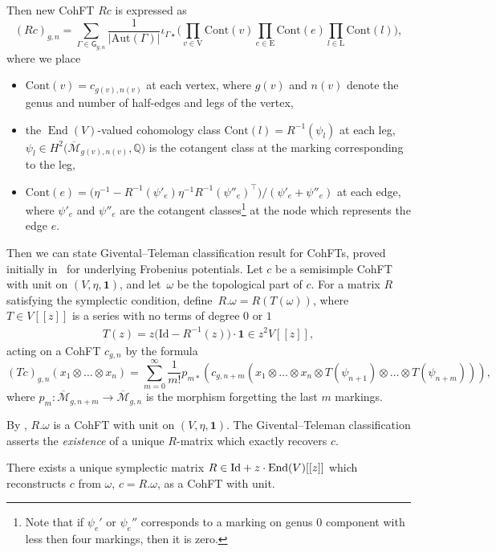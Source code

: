 \documentclass[pdftex]{sigma}
\def\End{{\rm End}}
\def\oM{\overline{\mathcal{M}}}
\def\b1{{\mathbf 1}}
\def\E{\mathrm{E}}
\def\L{\mathrm{L}}
\def\V{\mathrm{V}}
\numberwithin{equation}{section}
\begin{document}
Then new CohFT $Rc$ is expressed as
\[%
(Rc)_{g, n}=
\sum_{\Gamma\in\mathsf{G}_{g,n}} \frac{1}{|\mathrm{Aut}(\Gamma)|} \iota_{\Gamma \star} \biggl(
\prod_{v\in \V}\mathrm{Cont}(v)\prod_{e\in \E}\mathrm{Cont}(e)
\prod_{l\in \L}\mathrm{Cont}(l)
 \biggr) ,
 \]
 where we place
\begin{itemize}\itemsep=0pt
\item [(i)]
$\mathrm{Cont}(v)=c_{g(v), n(v)}$
at each vertex, where $g(v)$ and $n(v)$ denote the genus and number of half-edges and legs of the vertex,
\item [(ii)] the $\operatorname{End}(V)$-valued cohomology class
$\mathrm{Cont}(l)=R^{-1}(\psi_l)$
at each leg,
$\psi_l\!\in\! H^2\big(\oM_{g(v),n(v)},\mathbb{Q}\big)$
is the cotangent class at the marking corresponding to the leg,
\item [(iii)]
$\mathrm{Cont}(e)=\bigl(\eta^{-1}-R^{-1}(\psi'_e)\eta^{-1} R^{-1}(\psi''_e)^{\top}\bigr)/(\psi'_e+\psi''_e)$
at each edge,
where $\psi'_e$ and $\psi''_e$ are the cotangent classes\footnote{Note that if $\psi_e'$ or $\psi_e''$ corresponds to a marking on genus 0 component with less then four markings, then it is zero.} at the node which represents the edge $e$.
\end{itemize}
Then we can state Givental--Teleman classification result for CohFTs, proved initially in~\cite{T} for underlying Frobenius potentials.
Let $c$ be a semisimple CohFT with unit on $(V, \eta,\b1)$, and
let~$\omega$ be the topological part of $c$.
For a matrix $R$ satisfying the symplectic condition, define~${R.\omega = R(T(\omega))}$,
where $T\in V[[z]]$
is a series with no terms of degree $0$ or $1$
\begin{align*}
T(z)=z\big(\mathrm{Id}-R^{-1}(z)\big)\cdot \b1\in z^2V[[z]],
\end{align*}
acting on a CohFT $c_{g,n}$ by the formula
\begin{equation*}
(Tc)_{g, n} (x_1\otimes \dots \otimes x_n)=\sum_{m=0}^{\infty} \frac{1}{m!} p_{m*}
(c_{g, n+m}(x_1\otimes \dots \otimes x_n \otimes T(\psi_{n+1})\otimes \dots \otimes T(\psi_{n+m})))
 ,
\end{equation*}
where $p_{m}\colon \oM_{g, n+m}\to \oM_{g, n}$ is the morphism forgetting the last $m$ markings.

By \cite[Proposition 2.12]{PPZ}, $R.\omega$ is a CohFT with unit on $(V,\eta, \b1)$.
The Givental--Teleman classification asserts
the {\em existence} of a unique $R$-matrix which exactly
recovers $c$.

\begin{theorem*}[Teleman]
There exists a unique symplectic matrix
$R\in \mathrm{Id}+z\cdot \End (V)[[z]]$
which reconstructs $c$ from $\omega$,
$c=R.\omega $, as a CohFT with unit.
\end{theorem*}
\end{document}
